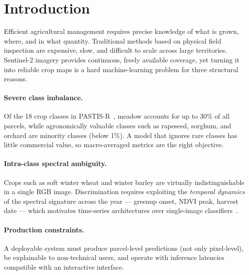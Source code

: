 \section{Introduction}
\label{sec:intro}

Efficient agricultural management requires precise knowledge of what is
grown, where, and in what quantity. Traditional methods based on
physical field inspection are expensive, slow, and difficult to scale
across large territories. Sentinel-2 imagery provides continuous,
freely available coverage, yet turning it into reliable crop maps is a
hard machine-learning problem for three structural reasons.

\paragraph{Severe class imbalance.}
Of the 18 crop classes in PASTIS-R~\cite{garnot2021pastis}, meadow
accounts for up to 30\% of all parcels, while agronomically valuable
classes such as rapeseed, sorghum, and orchard are minority classes
(below 1\%). A model that ignores rare classes has little commercial
value, so macro-averaged metrics are the right objective.

\paragraph{Intra-class spectral ambiguity.}
Crops such as soft winter wheat and winter barley are virtually
indistinguishable in a single RGB image. Discrimination requires
exploiting the \emph{temporal dynamics} of the spectral signature
across the year --- greenup onset, NDVI peak, harvest date --- which
motivates time-series architectures over single-image
classifiers~\cite{tarasiou2023tsvit,garnot2021utae}.

\paragraph{Production constraints.}
A deployable system must produce parcel-level predictions (not only
pixel-level), be explainable to non-technical users, and operate with
inference latencies compatible with an interactive interface.

